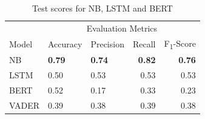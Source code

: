 \documentclass[11pt, a4paper]{article}
\begin{document}
\begin{table}
    \caption{Test scores for NB, LSTM and BERT}
    \label{tab:results}
    \centering
    \small

    \begin{tabular}{lllrr}
        \toprule
                                        & \multicolumn{4}{c}{Evaluation Metrics} \\
                                        \cmidrule{2-5}
                            Model       & Accuracy      & Precision     & Recall    & F\textsubscript{1}-Score \\
            \midrule
            \multirow{1}{*}{NB}         & \textbf{0.79}          & \textbf{0.74}          & \textbf{0.82}      & \textbf{0.76}                      \\
            \midrule
            \multirow{1}{*}{LSTM}       & 0.50          & 0.53          & 0.53      & 0.53                      \\
            \midrule
            \multirow{1}{*}{BERT}       & 0.52          & 0.17          & 0.33      & 0.23                      \\
            \midrule
            \multirow{1}{*}{VADER}      & 0.39          & 0.38          & 0.39      & 0.38                      \\

        \bottomrule
    \end{tabular}

\end{table}
\end{document}

